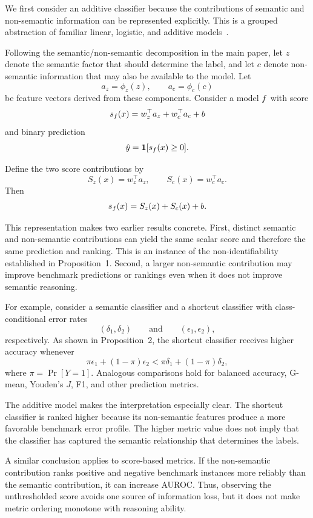 \documentclass[acmsmall,screen,review,anonymous]{acmart}
\begin{document}
We first consider an additive classifier because the contributions of
semantic and non-semantic information can be represented explicitly. This is
a grouped abstraction of familiar linear, logistic, and additive
models~\cite{joachims1998text,fan2008liblinear,hastie1986generalized,
yuan2006model}.

Following the semantic/non-semantic decomposition in the main paper, let \(z\) denote the
semantic factor that should determine the label, and let \(c\) denote
non-semantic information that may also be available to the model. Let
\[
a_z=\phi_z(z),
\qquad
a_c=\phi_c(c)
\]
be feature vectors derived from these components. Consider a model
\(f\) with score
\[
s_{f}(x)
=
w_z^\top a_z
+
w_c^\top a_c
+
b
\]
and binary prediction
\[
\hat y
=
\mathbf{1}[s_{f}(x)\ge 0].
\]

Define the two score contributions by
\[
S_z(x)=w_z^\top a_z,
\qquad
S_c(x)=w_c^\top a_c.
\]
Then
\[
s_{f}(x)
=
S_z(x)+S_c(x)+b.
\]

This representation makes two earlier results concrete. First, distinct
semantic and non-semantic contributions can yield the same scalar score and
therefore the same prediction and ranking. This is an instance of the
non-identifiability established in Proposition~1. Second, a larger
non-semantic contribution may improve benchmark predictions or rankings even
when it does not improve semantic reasoning.

For example, consider a semantic classifier and a shortcut classifier with
class-conditional error rates
\[
(\delta_1,\delta_2)
\qquad\text{and}\qquad
(\epsilon_1,\epsilon_2),
\]
respectively. As shown in Proposition~2, the shortcut classifier receives
higher accuracy whenever
\[
\pi\epsilon_1+(1-\pi)\epsilon_2
<
\pi\delta_1+(1-\pi)\delta_2,
\]
where \(\pi=\Pr[Y=1]\). Analogous comparisons hold for balanced accuracy,
G-mean, Youden's \(J\), F1, and other prediction metrics.

The additive model makes the interpretation especially clear. The shortcut
classifier is ranked higher because its non-semantic features produce a more
favorable benchmark error profile. The higher metric value does not imply
that the classifier has captured the semantic relationship that determines
the labels.

A similar conclusion applies to score-based metrics. If the non-semantic
contribution ranks positive and negative benchmark instances more reliably
than the semantic contribution, it can increase AUROC. Thus, observing the
unthresholded score avoids one source of information loss, but it does not
make metric ordering monotone with reasoning ability.
\end{document}
